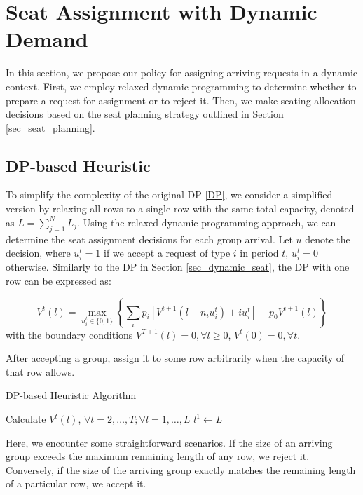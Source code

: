 \section{Seat Assignment with Dynamic Demand}\label{sec_dynamic}
In this section, we propose our policy for assigning arriving requests in a dynamic context. First, we employ relaxed dynamic programming to determine whether to prepare a request for assignment or to reject it. Then, we make seating allocation decisions based on the seat planning strategy outlined in Section \ref{sec_seat_planning}.


\subsection{DP-based Heuristic}
To simplify the complexity of the original DP \eqref{DP}, we consider a simplified version by relaxing all rows to a single row with the same total capacity, denoted as $\tilde{L} = \sum_{j=1}^{N} L_j$.  Using the relaxed dynamic programming approach, we can determine the seat assignment decisions for each group arrival. Let $u$ denote the decision, where $u_{i}^{t} = 1$ if we accept a request of type $i$ in period $t$, $u_{i}^{t} =0$ otherwise. Similarly to the DP in Section \ref{sec_dynamic_seat}, the DP with one row can be expressed as:

$$V^{t}(l) =  \max_{u_{i}^{t} \in \{0,1\}} \left\{ \sum_{i} p_i [V^{t+1}(l-n_i u_{i}^{t})+ i u_{i}^{t}] + p_0 V^{t+1}(l)\right\} $$
with the boundary conditions $V^{T+1}(l) =0, \forall l \geq 0$, $V^{t}(0) =0, \forall t$.

After accepting a group, assign it to some row arbitrarily when the capacity of that row allows.

\begin{algorithm}[H]
  \caption{DP-based Heuristic Algorithm}\label{algo_dp_heuris}
  Calculate $V^{t}(l)$, $\forall t =2, \ldots, T; \forall l = 1, \ldots, L$\;
  $l^{1} \gets L$\;
\end{algorithm}

Here, we encounter some straightforward scenarios. If the size of an arriving group exceeds the maximum remaining length of any row, we reject it. Conversely, if the size of the arriving group exactly matches the remaining length of a particular row, we accept it.

